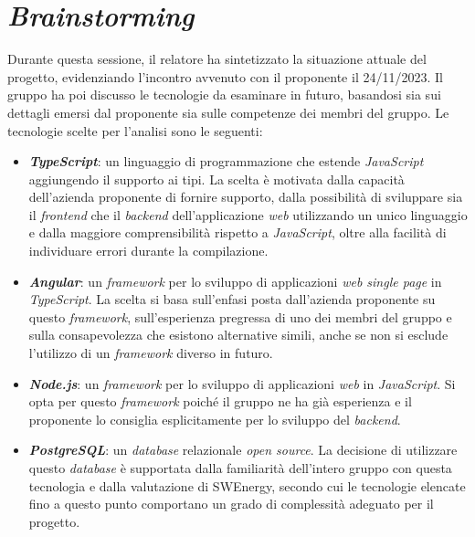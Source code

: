 \section{\textit{Brainstorming}}

Durante questa sessione, il relatore ha sintetizzato la situazione attuale del
progetto, evidenziando l'incontro avvenuto con il proponente il 24/11/2023. Il
gruppo ha poi discusso le tecnologie da esaminare in futuro, basandosi sia sui
dettagli emersi dal proponente sia sulle competenze dei membri del gruppo. Le
tecnologie scelte per l'analisi sono le
seguenti:

\begin{itemize}
	\item \textbf{\textit{TypeScript}}: un linguaggio di programmazione che
	      estende \textit{JavaScript} aggiungendo il supporto ai tipi. La scelta è
	      motivata dalla capacità dell'azienda proponente di fornire supporto, dalla
	      possibilità di sviluppare sia il \textit{frontend} che il \textit{backend}
	      dell'applicazione \textit{web} utilizzando un unico linguaggio e dalla
	      maggiore comprensibilità rispetto a \textit{JavaScript}, oltre alla facilità
	      di individuare errori durante la
	      compilazione.

	\item \textbf{\textit{Angular}}: un \textit{framework} per lo sviluppo di
	      applicazioni \textit{web single page} in \textit{TypeScript}. La scelta si
	      basa sull'enfasi posta dall'azienda proponente su questo \textit{framework},
	      sull'esperienza pregressa di uno dei membri del gruppo e sulla consapevolezza
	      che esistono alternative simili, anche se non si esclude l'utilizzo di un
	      \textit{framework} diverso in futuro.

	\item \textbf{\textit{Node.js}}: un \textit{framework} per lo sviluppo di
	      applicazioni \textit{web} in \textit{JavaScript}. Si opta per questo
	      \textit{framework} poiché il gruppo ne ha già esperienza e il
	      proponente lo consiglia esplicitamente per lo sviluppo del
	      \textit{backend}.

	\item \textbf{\textit{PostgreSQL}}: un \textit{database} relazionale
	      \textit{open source}. La decisione di utilizzare questo
	      \textit{database} è supportata dalla familiarità dell'intero gruppo con
	      questa tecnologia e dalla valutazione di SWEnergy, secondo cui le tecnologie
	      elencate fino a questo punto comportano un grado di complessità adeguato per
	      il progetto.
\end{itemize}

